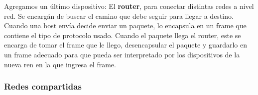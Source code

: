 Agregamos un último dispositivo: El \textbf{router}, para conectar distintas redes a nivel red. Se encargán de buscar el camino que debe seguir para llegar a destino. Cuando una host envía decide enviar un paquete, lo encapsula en un frame que contiene el tipo de protocolo usado. Cuando el paquete llega el router, este se encarga de tomar el frame que le llego, desencapsular el paquete y guardarlo en un frame adecuado para que pueda ser interpretado por los dispositivos de la nueva ren en la que ingresa el frame.

\subsubsection{Redes compartidas}
